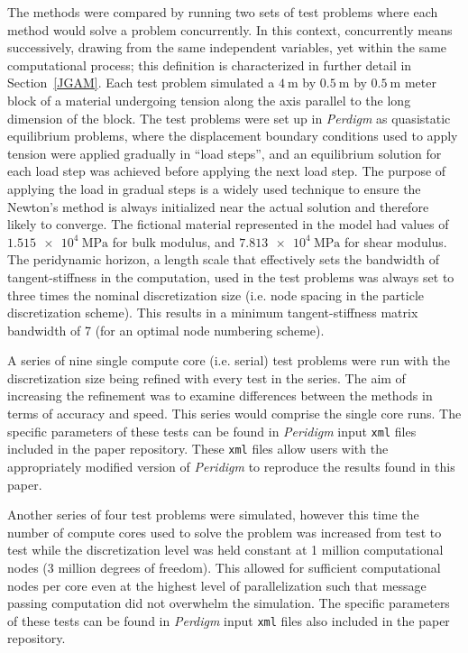 \documentclass[preprint,12pt]{elsarticle}
\begin{document}
The methods were compared by running two sets of test problems where each method would solve a problem concurrently. In this context, concurrently means successively, drawing from the same independent variables, yet within the same computational process; this definition is characterized in further detail in Section~\ref{JGAM}. Each test problem simulated a $\SI{4}{\meter}$ by $\SI{0.5}{\meter}$ by $\SI{0.5}{\meter}$ meter block of a material undergoing tension along the axis parallel to the long dimension of the block. The test problems were set up in \emph{Perdigm} as quasistatic equilibrium problems, where the displacement boundary conditions used to apply tension were applied gradually in ``load steps'', and an equilibrium solution for each load step was achieved before applying the next load step. The purpose of applying the load in gradual steps is a widely used technique to ensure the Newton's method is always initialized near the actual solution and therefore likely to converge. The fictional material represented in the model had values of $\SI{1.515e4}{\mega\pascal}$ for bulk modulus, and $\SI{7.813e4}{\mega\pascal}$ for shear modulus. The peridynamic horizon, a length scale that effectively sets the bandwidth of tangent-stiffness in the computation, used in the test problems was always set to three times the nominal discretization size (i.e. node spacing in the particle discretization scheme). This results in a minimum tangent-stiffness matrix bandwidth of 7 (for an optimal node numbering scheme).

A series of nine single compute core (i.e. serial) test problems were run with the discretization size being refined with every test in the series. The aim of increasing the refinement was to examine differences between the methods in terms of accuracy and speed. This series would comprise the single core runs. The specific parameters of these tests can be found in \emph{Peridigm} input {\tt xml} files included in the paper repository. These {\tt xml} files allow users with the appropriately modified version of \emph{Peridigm} to reproduce the results found in this paper.

Another series of four test problems were simulated, however this time the number of compute cores used to solve the problem was increased from test to test while the discretization level was held constant at 1 million computational nodes (3 million degrees of freedom). This allowed for sufficient computational nodes per core even at the highest level of parallelization such that message passing computation did not overwhelm the simulation.   The specific parameters of these tests can be found in \emph{Perdigm} input {\tt xml} files also included in the paper repository.
\end{document}
